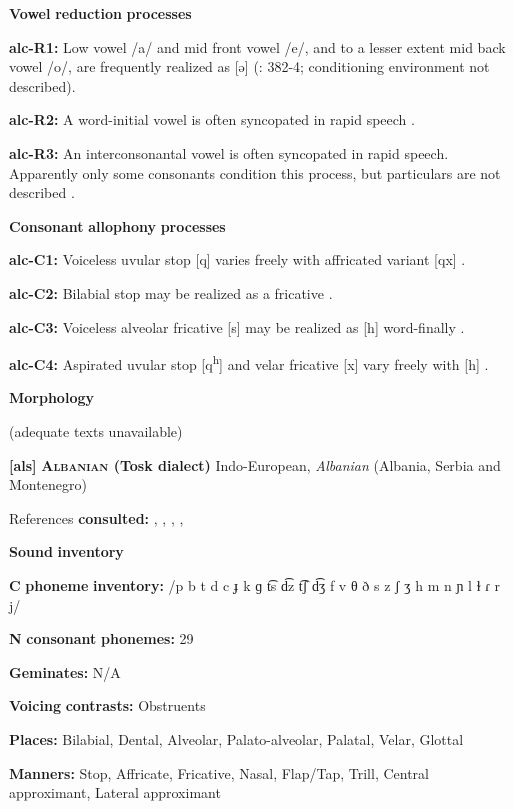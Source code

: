 \begin{styleBody}
\textbf{Vowel} \textbf{reduction} \textbf{processes}

\textbf{alc-R1:} Low vowel /a/ and mid front vowel /e/, and to a lesser extent mid back vowel /o/, are frequently realized as [ə] (\citealt{Clairis1985}: 382-4; conditioning environment not described).

\textbf{alc-R2:} A word-initial vowel is often syncopated in rapid speech \citep[393]{Clairis1985}.

\textbf{alc-R3:} An interconsonantal vowel is often syncopated in rapid speech. Apparently only some consonants condition this process, but particulars are not described \citep[393]{Clairis1985}.

\textbf{Consonant} \textbf{allophony} \textbf{processes}

\textbf{alc-C1:} Voiceless uvular stop [q] varies freely with affricated variant [qx] \citep[378]{Clairis1985}.

\textbf{alc-C2:}  Bilabial stop may be realized as a fricative \citep{Aguilera2001}.

\textbf{alc-C3:} Voiceless alveolar fricative [s] may be realized as [h] word-finally \citep[372]{Clairis1985}.

\textbf{alc-C4:} Aspirated uvular stop [q\textsuperscript{h}] and velar fricative [x] vary freely with [h] \citep[377-8]{Clairis1985}.

\textbf{Morphology}

(adequate texts unavailable)

\textbf{[als]}   \textbf{\textsc{Albanian} \textbf{(Tosk} \textbf{dialect)}}  Indo-European, \textit{Albanian} (Albania, Serbia and Montenegro)

References \textbf{consulted:} \citet{Bevington1974}, \citet{Klippenstein2010}, \citet{Newmark1957}, \citet{NewmarkEtAl1982}, \citet{Trommer2013}

\textbf{Sound} \textbf{inventory}

\textbf{C} \textbf{phoneme} \textbf{inventory:} /p b t d c ɟ k ɡ t͡s d͡z t͡ʃ d͡ʒ f v θ ð s z ʃ ʒ h m n ɲ l ɫ ɾ r j/

\textbf{N} \textbf{consonant} \textbf{phonemes:} 29

\textbf{Geminates:} N/A

\textbf{Voicing} \textbf{contrasts:} Obstruents

\textbf{Places:} Bilabial, Dental, Alveolar, Palato-alveolar, Palatal, Velar, Glottal

\textbf{Manners:} Stop, Affricate, Fricative, Nasal, Flap/Tap, Trill, Central approximant, Lateral approximant


\end{styleBody}
